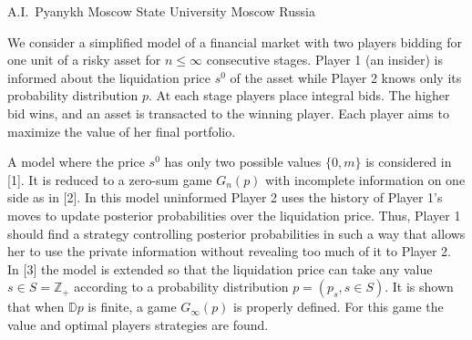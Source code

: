 %
%
%


 {%
  A.I.~Pyanykh%
} {%
  Moscow State University%
} {%
  Moscow%
} {%
  Russia%
}

%
%
We consider a simplified model of a financial market with two players bidding
for one unit of a risky asset for $n \leq \infty$ consecutive stages. Player 1
(an insider) is informed about the liquidation price $s^0$ of the asset while
Player 2 knows only its probability distribution $p$. At each stage players
place integral bids. The higher bid wins, and an asset is transacted to the
winning player. Each player aims to maximize the value of her final portfolio.

A model where the price $s^0$ has only two possible values $\{0, m\}$ is
considered in [1]. It is reduced to a zero-sum game $G_n(p)$ with incomplete
information on one side as in [2]. In this model uninformed Player 2 uses the
history of Player 1's moves to update posterior probabilities over the
liquidation price. Thus, Player 1 should find a strategy controlling posterior
probabilities in such a way that allows her to use the private information
without revealing too much of it to Player 2. In [3] the model is extended so
that the liquidation price can take any value $s \in S = \mathbb{Z}_+$ according
to a probability distribution $p = (p_s, s \in S)$. It is shown that when
$\mathbb{D}p$ is finite, a game $G_\infty(p)$ is properly defined. For this game
the value and optimal players strategies are found.

